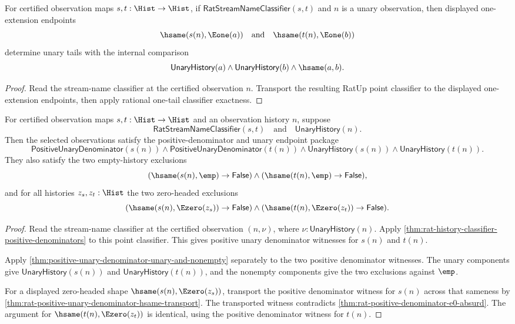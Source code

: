 \begin{theorem}
\label{thm:rat-stream-name-classifier-observation-e1-pair-readback}
For certified observation maps $s,t:\Hist\to\Hist$, if
$\mathsf{RatStreamNameClassifier}(s,t)$ and $n$ is a unary observation, then
displayed one-extension endpoints
$$
\hsame(s(n),\Eone(a))\quad\text{and}\quad \hsame(t(n),\Eone(b))
$$
determine unary tails with the internal comparison
$$
\mathsf{UnaryHistory}(a)\land\mathsf{UnaryHistory}(b)\land\hsame(a,b).
$$
\end{theorem}
\begin{proof}
Read the stream-name classifier at the certified observation $n$. Transport the
resulting RatUp point classifier to the displayed one-extension endpoints, then
apply rational one-tail classifier exactness.
\end{proof}

\begin{theorem}
\label{thm:rat-stream-name-classifier-observation-shape-exclusions}
For certified observation maps $s,t:\Hist\to\Hist$ and an observation history
$n$, suppose
$$
\mathsf{RatStreamNameClassifier}(s,t)\quad\text{and}\quad
\mathsf{UnaryHistory}(n).
$$
Then the selected observations satisfy the positive-denominator and unary
endpoint package
$$
\mathsf{PositiveUnaryDenominator}(s(n))\land
\mathsf{PositiveUnaryDenominator}(t(n))\land
\mathsf{UnaryHistory}(s(n))\land
\mathsf{UnaryHistory}(t(n)).
$$
They also satisfy the two empty-history exclusions
$$
(\hsame(s(n),\emp)\to\mathsf{False})\land
(\hsame(t(n),\emp)\to\mathsf{False}),
$$
and for all histories $z_s,z_t:\Hist$ the two zero-headed exclusions
$$
(\hsame(s(n),\Ezero(z_s))\to\mathsf{False})\land
(\hsame(t(n),\Ezero(z_t))\to\mathsf{False}).
$$
\end{theorem}
\begin{proof}
Read the stream-name classifier at the certified observation $(n,\nu)$, where
$\nu:\mathsf{UnaryHistory}(n)$. Apply
\autoref{thm:rat-history-classifier-positive-denominators} to this point
classifier. This gives positive unary denominator witnesses for $s(n)$ and
$t(n)$.

Apply \autoref{thm:positive-unary-denominator-unary-and-nonempty} separately
to the two positive denominator witnesses. The unary components give
$\mathsf{UnaryHistory}(s(n))$ and $\mathsf{UnaryHistory}(t(n))$, and the
nonempty components give the two exclusions against $\emp$.

For a displayed zero-headed shape $\hsame(s(n),\Ezero(z_s))$, transport the
positive denominator witness for $s(n)$ across that sameness by
\autoref{thm:rat-positive-unary-denominator-hsame-transport}. The transported
witness contradicts \autoref{thm:rat-positive-denominator-e0-absurd}. The
argument for $\hsame(t(n),\Ezero(z_t))$ is identical, using the positive
denominator witness for $t(n)$.
\end{proof}

